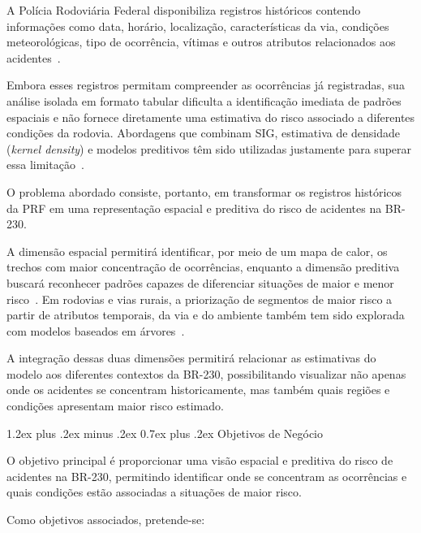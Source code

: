 \documentclass[11pt,a4paper]{article}
\makeatletter
\renewcommand\subsection{
\@startsection{subsection}{2}{0pt}%
{1.2ex plus .2ex minus .2ex}%
{0.7ex plus .2ex}%
{\normalfont\large\bfseries}
}
\makeatother
\begin{document}
A Polícia Rodoviária Federal disponibiliza registros históricos contendo informações como data, horário, localização, características da via, condições meteorológicas, tipo de ocorrência, vítimas e outros atributos relacionados aos acidentes~\cite{prfdados}.

Embora esses registros permitam compreender as ocorrências já registradas, sua análise isolada em formato tabular dificulta a identificação imediata de padrões espaciais e não fornece diretamente uma estimativa do risco associado a diferentes condições da rodovia. Abordagens que combinam SIG, estimativa de densidade (\textit{kernel density}) e modelos preditivos têm sido utilizadas justamente para superar essa limitação~\cite{khan2024,le2020,jeyabharathi2026}.

O problema abordado consiste, portanto, em transformar os registros históricos da PRF em uma representação espacial e preditiva do risco de acidentes na BR-230.

A dimensão espacial permitirá identificar, por meio de um mapa de calor, os trechos com maior concentração de ocorrências, enquanto a dimensão preditiva buscará reconhecer padrões capazes de diferenciar situações de maior e menor risco~\cite{santos2021,behboudi2024,gao2024}. Em rodovias e vias rurais, a priorização de segmentos de maior risco a partir de atributos temporais, da via e do ambiente também tem sido explorada com modelos baseados em árvores~\cite{iranmanesh2022}.

A integração dessas duas dimensões permitirá relacionar as estimativas do modelo aos diferentes contextos da BR-230, possibilitando visualizar não apenas onde os acidentes se concentram historicamente, mas também quais regiões e condições apresentam maior risco estimado.

\subsection{Objetivos de Negócio}

O objetivo principal é proporcionar uma visão espacial e preditiva do risco de acidentes na BR-230, permitindo identificar onde se concentram as ocorrências e quais condições estão associadas a situações de maior risco.

Como objetivos associados, pretende-se:
\end{document}
